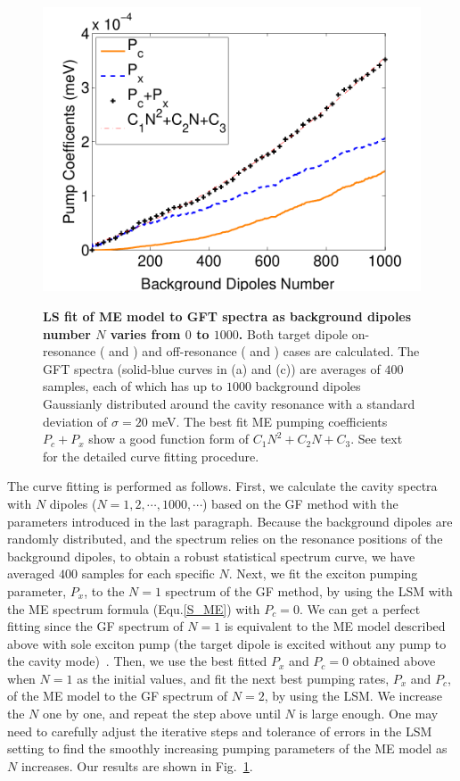 \begin{figure}[htp]
{                %
          \includegraphics[width=.46\textwidth]{./Figs/P_weak}}
     \caption[Pumping as a tool for dipoles excitation.]{\textbf{  LS fit of ME model to GFT spectra as background dipoles number $N$ varies from $0$ to $1000$.} Both target dipole on-resonance ( and ) and off-resonance ( and ) cases are calculated. The GFT spectra (solid-blue curves in (a) and (c)) are averages of $400$ samples, each of which has up to $1000$ background dipoles Gaussianly distributed around the cavity resonance with a standard deviation of $\sigma=20$ meV. The best fit ME pumping coefficients $P_c+P_x$ show a good function form of $C_1N^2+C_2N+C_3$. See text for the detailed curve fitting procedure.}
     \label{fig:GFT_ME_fits}
\end{figure}

The curve fitting is performed as follows. First, we calculate the cavity spectra with $N$ dipoles ($N=1,2,\cdots,1000,\cdots$) based on the GF method with the parameters introduced in the last paragraph. Because the background dipoles are randomly distributed, and the spectrum relies on the resonance positions of the background dipoles, to obtain a robust statistical spectrum curve, we have averaged $400$ samples for each specific $N$. Next, we fit the exciton pumping parameter, $P_x$, to the $N=1$ spectrum of the GF method, by using the LSM with the ME spectrum formula (Equ.\eqref{S_ME}) with $P_c=0$. We can get a perfect fitting since the GF spectrum of $N=1$ is equivalent to the ME model described above with sole exciton pump (the target dipole is excited without any pump to the cavity mode)~\cite{Hughes2009}. Then, we use the best fitted $P_x$ and $P_c=0$ obtained above when $N=1$ as the initial values, and fit the next best pumping rates, $P_x$ and $P_c$, of the ME model to the GF spectrum of $N=2$, by using the LSM. We increase the $N$ one by one, and repeat the step above until $N$ is large enough. One may need to carefully adjust the iterative steps and tolerance of errors in the LSM setting to find the smoothly increasing pumping parameters of the ME model as $N$ increases. Our results are shown in Fig.~\ref{fig:GFT_ME_fits}.

